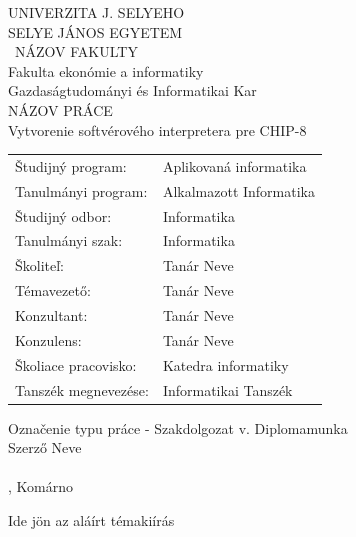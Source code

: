 \documentclass[a4paper,oneside,onecolumn,12pt]{LegrandOrangeBook}
\begin{document}
\cleardoublepage
\begingroup
\makeatletter
\let\ps@plain\ps@empty
\begin{minipage}[c][\textheight][c]{\textwidth}
	{\centering
	{\large UNIVERZITA J. SELYEHO\\SELYE JÁNOS EGYETEM}\\
	\vskip0.5cm
	{\ NÁZOV FAKULTY\\Fakulta ekonómie a informatiky\\Gazdaságtudományi és Informatikai Kar}\\
	\vfill
	{\Large NÁZOV PRÁCE\\Vytvorenie softvérového interpretera pre CHIP-8 }\\
	\vfill
	\thispagestyle{empty}
	\begin{tabular}{ll}
		Študijný program:    & Aplikovaná informatika \\
		Tanulmányi program:  & Alkalmazott Informatika\\
		Študijný odbor:      & Informatika\\
		Tanulmányi szak:     & Informatika\\
		Školiteľ:            & Tanár Neve\\
		Témavezető:          & Tanár Neve\\
		Konzultant:          & Tanár Neve \\
		Konzulens:           & Tanár Neve\\
		Školiace pracovisko: & Katedra informatiky\\
		Tanszék megnevezése: & Informatikai Tanszék\\
	\end{tabular}
	\vfill
	Označenie typu práce - Szakdolgozat v. Diplomamunka\\
	Szerző Neve\\
    \ISBN \\
	\hfill\the\year{}, Komárno\hfill
	}
\end{minipage}
\endgroup
{
\hspace*{-2cm}
Ide jön az aláírt témakiírás
}
\tableofcontents %
\pagebreak
\listoffigures  %

\pagebreak

\newcommand{\chpt}[1]{\chapter*{#1}\addcontentsline{toc}{section}{#1}}
\end{document}
